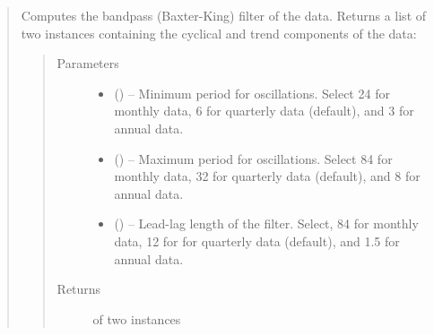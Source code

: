 \documentclass[letterpaper,10pt,openany,oneside,english]{sphinxmanual}
\begin{document}
\begin{fulllineitems}
\begin{quote}
\begin{fulllineitems}
\begin{quote}
\begin{description}
\end{description}\end{quote}

\end{fulllineitems}


\begin{fulllineitems}
\label{\detokenize{series_class:fredpy.series.bpfilter}}
Computes the bandpass (Baxter-King) filter of the data. Returns a list of two {\hyperref[\detokenize{series_class:fredpy.series}]{}} instances containing the cyclical and trend components of the data:
\begin{quote}

\end{quote}
\begin{quote}\begin{description}
\item[{Parameters}] \leavevmode\begin{itemize}
\item {} 
 (\href{https://docs.python.org/2/library/functions.html\#int}{}) -- Minimum period for oscillations. Select 24 for monthly data, 6 for quarterly data (default), and 3 for annual data.

\item {} 
 (\href{https://docs.python.org/2/library/functions.html\#int}{}) -- Maximum period for oscillations. Select 84 for monthly data, 32 for quarterly data (default), and 8 for annual data.

\item {} 
 (\href{https://docs.python.org/2/library/functions.html\#int}{}) -- Lead-lag length of the filter. Select, 84 for monthly data, 12 for for quarterly data (default), and 1.5 for annual data.

\end{itemize}

\item[{Returns}] \leavevmode
\href{https://docs.python.org/2/library/functions.html\#list}{} of two {\hyperref[\detokenize{series_class:fredpy.series}]{}} instances


\end{description}
\end{quote}
\end{fulllineitems}
\end{quote}
\end{fulllineitems}
\end{document}
